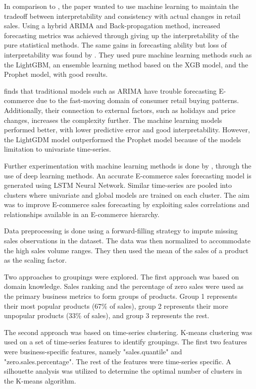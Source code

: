 In comparison to \cite{Weng2020}, the paper \cite{Bowen2020} wanted to use machine learning to maintain
the tradeoff between interpretability and consistency with actual
changes in retail sales.
Using a hybrid ARIMA and Back-propagation method, increased forecasting metrics was achieved through
giving up the interpretability of the pure statistical methods.
The same gains in forecasting ability but loss of interpretability was
found by \cite{Zunic2020}.
They used pure machine learning methods such as the LightGBM, an ensemble learning method based on the XGB model,
and the Prophet model, with good results.

\cite{Bowen2020} finds that traditional models such as ARIMA have trouble forecasting E-commerce
due to the fast-moving domain of consumer retail buying patterns.
Additionally, their connection to external factors,
such as holidays and price changes, increases the complexity further.
The machine learning models performed better, with lower predictive error
and good interpretability.
However, the LightGDM model outperformed the Prophet model because of the
models limitation to univariate time-series.


Further experimentation with machine learning methods is done by \cite{Bandara2019},
through the use of deep learning methods.
An accurate E-commerce sales forecasting model is generated using LSTM  Neural Network.
Similar time-series are pooled into clusters where univariate and global models are trained on each cluster.
The aim was to improve E-commerce sales forecasting by exploiting sales correlations and relationships
available in an E-commerce hierarchy.

Data preprocessing is done using a forward-filling strategy to impute missing sales
observations in the dataset.
The data was then normalized to accommodate the high sales volume ranges.
They then used the mean of the sales of a product as the scaling factor.

Two approaches to groupings were explored.
The first approach was based on domain knowledge.
Sales ranking and the percentage of zero sales were used as the primary business metrics
to form groups of products.
Group 1 represents their most popular products (67\% of sales), group 2 represents
their more unpopular products (33\% of sales), and group 3 represents the rest.

The second approach was based on time-series clustering.
K-means clustering was used on a set of time-series features to identify groupings.
The first two features were business-specific features, namely "sales.quantile" and "zero.sales.percentage".
The rest of the features were time-series specific.
A silhouette analysis was utilized to determine the optimal number of clusters in the K-means algorithm.

